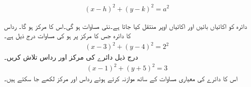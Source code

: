 \begin{align}
(x-h)^2+(y-k)^2=a^2
\end{align}

دائرہ  کو  اکائیاں بائیں اور  اکائیاں اوپر منتقل کیا جاتا ہے۔نئی مساوات  ہو گی۔اس کا مرکز  ہو گا۔
رداس  کا دائرہ جس کا مرکز   پر ہو کی مساوات درج ذیل ہے۔
\begin{align*}
(x-3)^2+(y-4)^2=2^2
\end{align*}
درج ذیل دائرے کی مرکز  اور رداس تلاش کریں۔
\begin{align*}
(x-1)^2+(y+5)^2=3
\end{align*}
اس کا دائرے کی معیاری مساوات کے ساتھ موازنہ کرتے ہوئے رداس  اور مرکز  لکھے جا سکتے ہیں۔  

